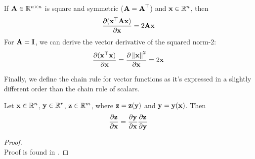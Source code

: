 \documentclass[a4paper]{article}
\begin{document}
\begin{lemma}
If $\textbf{A}\in \mathbb{R}^{n\times n}$ is square and symmetric ($\textbf{A} = \textbf{A}^{\top}$) and $\textbf{x}\in \mathbb{R}^n$, then
\begin{equation}
    \frac{\partial (\textbf{x}^{\top}\textbf{A}\textbf{x})}{\partial \textbf{x}} = 2\textbf{A}\textbf{x}
\end{equation}
For $\textbf{A}=\textbf{I}$, we can derive the vector derivative of the squared norm-2:
\begin{equation}
    \frac{\partial (\textbf{x}^{\top}\textbf{x})}{\partial \textbf{x}} = \frac{\partial \left\lVert\textbf{x}\right\rVert^2}{\partial \textbf{x}} = 2\textbf{x}
\end{equation}
\end{lemma}
Finally, we define the chain rule for vector functions as it's expressed in a slightly different order than the chain rule of scalars.
\begin{lemma}
Let $\textbf{x}\in\mathbb{R}^n$, $\textbf{y} \in \mathbb{R}^r$, $\textbf{z} \in \mathbb{R}^m$, where $\textbf{z} = \textbf{z}(\textbf{y})$ and $\textbf{y} = \textbf{y}(\textbf{x})$. Then
\begin{equation}
    \frac{\partial \textbf{z}}{\partial \textbf{x}} = \frac{\partial \textbf{y}}{\partial \textbf{x}} \frac{\partial \textbf{z}}{\partial \textbf{y}}
\end{equation}
\end{lemma}

\begin{proof} \quad \\
Proof is found in  \cite{weizhu}.
\end{proof}




\newpage
\printbibliography





\end{document}
